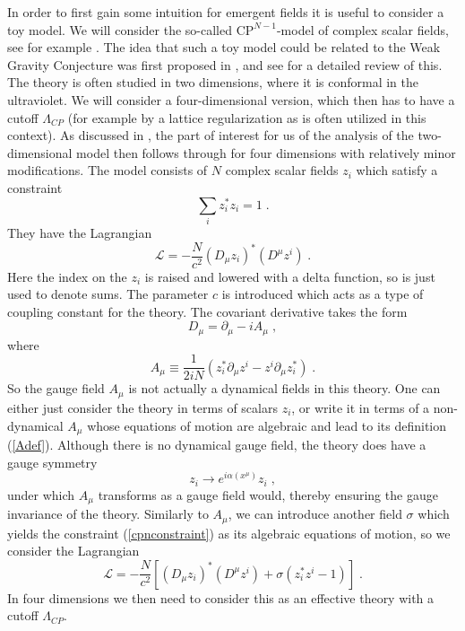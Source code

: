 \documentclass[11pt,a4paper]{article}
\numberwithin{equation}{section}
\numberwithin{table}{section}\setlength{\multlinegap}{25pt}
\newcommand{\cL}{\mathcal{L}}
\newcommand{\be}{\begin{equation}}
\newcommand{\ee}{\end{equation}}
\begin{document}
{In order to first gain some intuition for emergent fields it is useful to consider a toy model. We will consider the so-called $\mathrm{CP}^{N-1}$-model of complex scalar fields, see for example \cite{DAdda:1978vbw,Witten:1978bc,Rabinovici:2011jj}. The idea that such a toy model could be related to the Weak Gravity Conjecture was first proposed in \cite{Harlow:2015lma}, and see \cite{Schadow} for a detailed review of this. The theory is often studied in two dimensions, where it is conformal in the ultraviolet. We will consider a four-dimensional version, which then has to have a cutoff $\Lambda_{CP}$ (for example by a lattice regularization as is often utilized in this context).  As discussed in \cite{Harlow:2015lma}, the part of interest for us of the analysis of the two-dimensional model then follows through for four dimensions with relatively minor modifications. The model consists of $N$ complex scalar fields $z_i$ which satisfy a constraint
\be
\sum_i z_i^* z_i = 1 \;.
\label{cpnconstraint}
\ee
They have the Lagrangian
\be
\cL = -\frac{N}{c^2} \left(D_{\mu} z_i \right)^* \left(D^{\mu} z^i \right) \;. 
\label{cpnstar}
\ee
Here the index on the $z_i$ is raised and lowered with a delta function, so is just used to denote sums. The parameter $c$ is introduced which acts as a type of coupling constant for the theory. The covariant derivative takes the form
\be
D_{\mu} = \partial_{\mu} - i A_{\mu} \;, 
\ee
where 
\be
A_{\mu} \equiv \frac{1}{2iN} \left( z_i^* \partial_{\mu} z^i - z^i \partial_{\mu} z_i^*\right) \;.
\label{Adef}
\ee
So the gauge field $A_{\mu}$ is not actually a dynamical fields in this theory. One can either just consider the theory in terms of scalars $z_i$, or write it in terms of a non-dynamical $A_{\mu}$ whose equations of motion are algebraic and lead to its definition (\ref{Adef}). Although there is no dynamical gauge field, the theory does have a gauge symmetry
\be
z_i \rightarrow e^{i\alpha\left(x^{\mu}\right)} z_i \;,
\ee
under which $A_{\mu}$ transforms as a gauge field would, thereby ensuring the gauge invariance of the theory. Similarly to $A_{\mu}$, we can introduce another field $\sigma$ which yields the constraint (\ref{cpnconstraint}) as its algebraic equations of motion, so we consider the Lagrangian
\be
\cL = -\frac{N}{c^2}\left[ \left(D_{\mu} z_i \right)^* \left(D^{\mu} z^i \right)  + \sigma \left( z_i^* z^i - 1\right) \right] \;. 
\label{cpnaction}
\ee
In four dimensions we then need to consider this as an effective theory with a cutoff $\Lambda_{CP}$.

}
\end{document}
